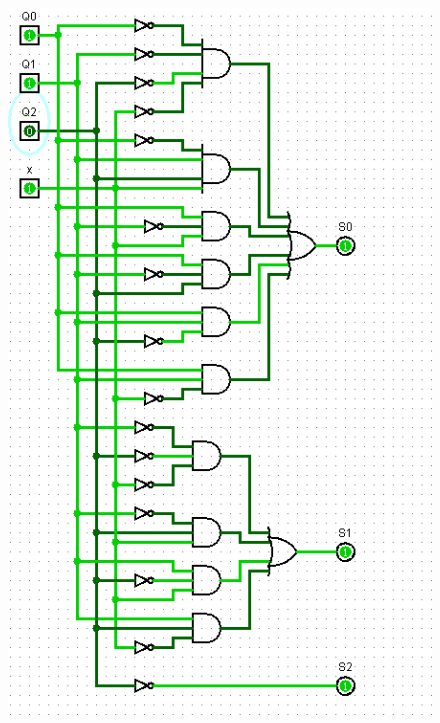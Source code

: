 \documentclass[]{article}
\begin{document}
\begin{minipage}{0.5\textwidth}
\begin{figure}[H]
	\centering
	\includegraphics[width=1\textwidth]{test1_6.png}
\end{figure}
\end{minipage}
\end{document}

